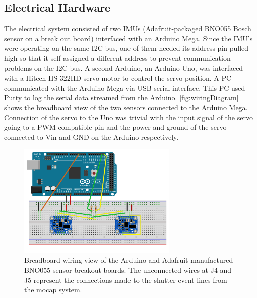 \documentclass[letterpaper, 10 pt, conference]{ieeeconf}  %
\begin{document}
\subsection{Electrical Hardware}
The electrical system consisted of two IMUs (Adafruit-packaged BNO055 Bosch sensor on a break out board) interfaced with an Arduino Mega. Since the IMU's were operating on the same I2C bus, one of them needed its address pin pulled high so that it self-assigned a different address to prevent communication problems on the I2C bus. A second Arduino, an Arduino Uno, was interfaced with a Hitech HS-322HD servo motor to control the servo position. A PC communicated with the Arduino Mega via USB serial interface. This PC used Putty to log the serial data streamed from the Arduino. \autoref{fig:wiringDiagram} shows the breadboard view of the two sensors connected to the Arduino Mega. Connection of the servo to the Uno was trivial with the input signal of the servo going to a PWM-compatible pin and the power and ground of the servo connected to Vin and GND on the Arduino respectively.

\begin{figure}[thpb]
	\centering
	\includegraphics[width = 3in]{Arduino_schematic_bb.pdf}
    \caption{Breadboard wiring view of the Arduino and Adafruit-manufactured BNO055 sensor breakout boards. The unconnected wires at J4 and J5 represent the connections made to the shutter event lines from the mocap system.}
    \label{fig:wiringDiagram}
\end{figure}
\end{document}

